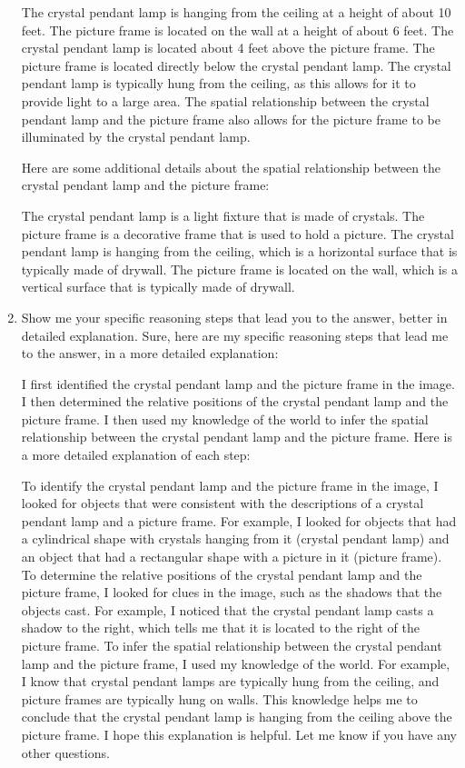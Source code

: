 \begin{enumerate}
    The crystal pendant lamp is hanging from the ceiling at a height of about 10 feet.
    The picture frame is located on the wall at a height of about 6 feet.
    The crystal pendant lamp is located about 4 feet above the picture frame.
    The picture frame is located directly below the crystal pendant lamp.
    The crystal pendant lamp is typically hung from the ceiling, as this allows for it to provide light to a large area. The spatial relationship between the crystal pendant lamp and the picture frame also allows for the picture frame to be illuminated by the crystal pendant lamp.
    
    Here are some additional details about the spatial relationship between the crystal pendant lamp and the picture frame:
    
    The crystal pendant lamp is a light fixture that is made of crystals.
    The picture frame is a decorative frame that is used to hold a picture.
    The crystal pendant lamp is hanging from the ceiling, which is a horizontal surface that is typically made of drywall.
    The picture frame is located on the wall, which is a vertical surface that is typically made of drywall.
    \item Show me your specific reasoning steps that lead you to the answer, better in detailed explanation.
    \subitem 
    Sure, here are my specific reasoning steps that lead me to the answer, in a more detailed explanation:
    
    I first identified the crystal pendant lamp and the picture frame in the image.
    I then determined the relative positions of the crystal pendant lamp and the picture frame.
    I then used my knowledge of the world to infer the spatial relationship between the crystal pendant lamp and the picture frame.
    Here is a more detailed explanation of each step:
    
    To identify the crystal pendant lamp and the picture frame in the image, I looked for objects that were consistent with the descriptions of a crystal pendant lamp and a picture frame. For example, I looked for objects that had a cylindrical shape with crystals hanging from it (crystal pendant lamp) and an object that had a rectangular shape with a picture in it (picture frame).
    To determine the relative positions of the crystal pendant lamp and the picture frame, I looked for clues in the image, such as the shadows that the objects cast. For example, I noticed that the crystal pendant lamp casts a shadow to the right, which tells me that it is located to the right of the picture frame.
    To infer the spatial relationship between the crystal pendant lamp and the picture frame, I used my knowledge of the world. For example, I know that crystal pendant lamps are typically hung from the ceiling, and picture frames are typically hung on walls. This knowledge helps me to conclude that the crystal pendant lamp is hanging from the ceiling above the picture frame.
    I hope this explanation is helpful. Let me know if you have any other questions.
\end{enumerate}
